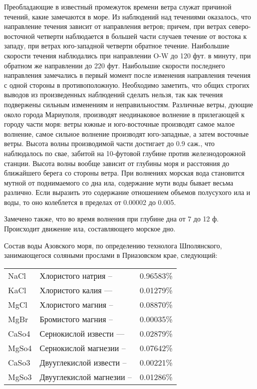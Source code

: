 Преобладающие в известный промежуток времени ветра служат причиной течений,
какие замечаются в море. Из наблюдений над течениями оказалось, что направление
течения зависит от направления ветров; причем, при ветрах северо-восточной
четверти наблюдается в большей части случаев течение от востока к западу, при
ветрах юго-западной четверти обратное течение. Наибольшие скорости течения
наблюдались при направлении O-W до 120 фут. в минуту, при обратном же
направлении до 220 фут. Наибольшие скорости последнего направления замечались в
первый момент после изменения направления течения с одной стороны в
противоположную. Необходимо заметить, что общих строгих выводов из
произведенных наблюдений сделать нельзя, так как течения подвержены сильным
изменениям и неправильностям. Различные ветры, дующие около города Мариуполя,
производят неодинаковое волнение в прилегающей к городу части моря: ветры южные
и юго-восточные производят самое малое волнение, самое сильное волнение
производят юго-западные, а затем  восточные ветры. Высота волны производимой
части достигает до 0.9 саж., что наблюдалось по свае, забитой на 10-футовой
глубине против железнодорожной станции. Высота волны вообще зависит от глубины
моря и расстояния до ближайшего берега со стороны ветра. При волнениях морская
вода становится мутной от поднимаемого со дна ила, содержание мути воды бывает
весьма различно. Если выразить это содержание отношением объемов полусухого ила
и воды, то оно колеблется в пределах от 0.00002 до 0.005.

Замечено также, что во время волнения при глубине дна от 7 до 12 ф. Происходит
движение ила, составляющего морское дно.

Состав воды Азовского моря, по определению технолога Шполянского, занимающегося
соляными прослами в Приазовском крае, следующий:

\bigskip
\begin{tabular}{lll}
NaCl  & Хлористого натрия –      & 0.96583\%  \\
KaCl  & Хлористого калия  —      & 0.01279\%  \\
MgCl  & Хлористого магния –      & 0.08870\%  \\
MgBr  & Бромистого магния –      & 0.00035\%  \\
CaSo4 & Сернокислой извести  —   & 0.02879\%  \\
MgSo4 & Сернокислой магнезии –   & 0.07642\%  \\
CaSo3 & Двууглекислой извести –  & 0.00221\%  \\
MgSo3 & Двууглекислой магнезии – & 0.01286\%  \\
\end{tabular}
\bigskip

